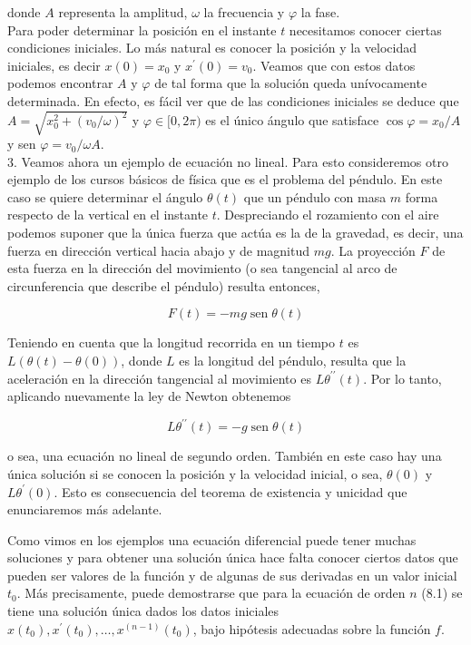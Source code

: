 \documentclass[10pt]{article}
\begin{document}
donde $A$ representa la amplitud, $\omega$ la frecuencia y $\varphi$ la fase.\\
Para poder determinar la posición en el instante $t$ necesitamos conocer ciertas condiciones iniciales. Lo más natural es conocer la posición y la velocidad iniciales, es decir $x(0)=x_{0}$ y $x^{\prime}(0)=v_{0}$. Veamos que con estos datos podemos encontrar $A$ y $\varphi$ de tal forma que la solución queda unívocamente determinada. En efecto, es fácil ver que de las condiciones iniciales se deduce que $A=\sqrt{x_{0}^{2}+\left(v_{0} / \omega\right)^{2}}$ y $\varphi \in[0,2 \pi)$ es el único ángulo que satisface $\cos \varphi=x_{0} / A$ y sen $\varphi=v_{0} / \omega A$.\\
3. Veamos ahora un ejemplo de ecuación no lineal. Para esto consideremos otro ejemplo de los cursos básicos de física que es el problema del péndulo. En este caso se quiere determinar el ángulo $\theta(t)$ que un péndulo con masa $m$ forma respecto de la vertical en el instante $t$. Despreciando el rozamiento con el aire podemos suponer que la única fuerza que actúa es la de la gravedad, es decir, una fuerza en dirección vertical hacia abajo y de magnitud $m g$. La proyección $F$ de esta fuerza en la dirección del movimiento (o sea tangencial al arco de circunferencia que describe el péndulo) resulta entonces,

$$
F(t)=-m g \operatorname{sen} \theta(t)
$$

Teniendo en cuenta que la longitud recorrida en un tiempo $t$ es $L(\theta(t)-\theta(0))$, donde $L$ es la longitud del péndulo, resulta que la aceleración en la dirección tangencial al movimiento es $L \theta^{\prime \prime}(t)$. Por lo tanto, aplicando nuevamente la ley de Newton obtenemos

$$
L \theta^{\prime \prime}(t)=-g \operatorname{sen} \theta(t)
$$

o sea, una ecuación no lineal de segundo orden. También en este caso hay una única solución si se conocen la posición y la velocidad inicial, o sea, $\theta(0)$ y $L \theta^{\prime}(0)$. Esto es consecuencia del teorema de existencia y unicidad que enunciaremos más adelante.

Como vimos en los ejemplos una ecuación diferencial puede tener muchas soluciones y para obtener una solución única hace falta conocer ciertos datos que pueden ser valores de la función y de algunas de sus derivadas en un valor inicial $t_{0}$. Más precisamente, puede demostrarse que para la ecuación de orden $n$ (8.1) se tiene una solución única dados los datos iniciales $x\left(t_{0}\right), x^{\prime}\left(t_{0}\right), \ldots, x^{(n-1)}\left(t_{0}\right)$, bajo hipótesis adecuadas sobre la función $f$.
\end{document}
